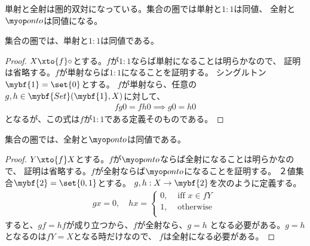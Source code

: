 	単射と全射は圏的双対になっている。集合の圏では単射と$1:1$は同値、
	全射と$\onto$は同値になる。

	\begin{proposition}[集合の圏での単射と一対一写像]
	\label{prop:集合の圏での単射と一対一写像} %
		集合の圏では、単射と$1:1$は同値である。
	\end{proposition} %
	\begin{proof} %
		$X\xto{f}\circ$とする。$f$が$1:1$ならば単射になることは明らかなので、
		証明は省略する。$f$が単射ならば$1:1$になることを証明する。
		シングルトン$\mybf{1}=\set{0}$とする。
		$f$が単射なら、任意の$g,h\in\mybf{Set}(\mybf{1},X)$に対して、
		\begin{equation*}\begin{split} %
			fg0 = fh0 \implies g0 = h0
		\end{split}\end{equation*} %
		となるが、この式は$f$が$1:1$である定義そのものである。
	\end{proof} %

	\begin{proposition}[集合の圏での全射と上への写像]
	\label{prop:集合の圏での全射と上への写像} %
		集合の圏では、全射と$\onto$は同値である。
	\end{proposition} %
	\begin{proof} %
		$Y\xto{f}X$とする。$f$が$\onto$ならば全射になることは明らかなので、
		証明は省略する。$f$が全射ならば$\onto$になることを証明する。
		２値集合$\mybf{2}=\set{0,1}$とする。
		$g,h:X\to\mybf{2}$を次のように定義する。
		\begin{equation*}\begin{split} %
			g x = 0,\quad
			h x = \begin{cases}
				0, &\text{ iff } x\in fY \\
				1, &\text{ otherwise } \\
			\end{cases}
		\end{split}\end{equation*} %
		すると、$gf=hf$が成り立つから、$f$が全射なら、$g=h$
		となる必要がある。$g=h$となるのは$fY=X$となる時だけなので、
		$f$は全射になる必要がある。
	\end{proof} %

